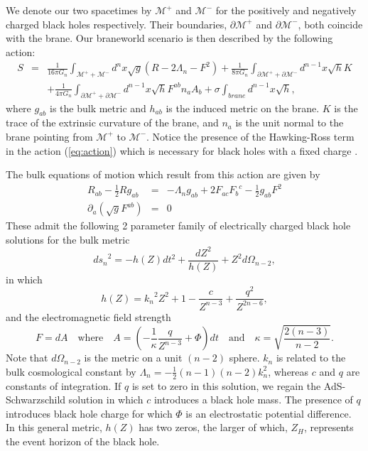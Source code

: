 \documentclass[a4paper,12pt]{article}
\begin{document}
We denote our two spacetimes by $\mathcal{M}^+$ and $\mathcal{M}^-$
for the positively and negatively charged black holes respectively.
Their boundaries, $\partial\mathcal{M}^+$ and $\partial\mathcal{M}^-$,
both coincide with the brane.  Our braneworld scenario is then
described by the following action:
\begin{eqnarray}
\label{eq:action}
S & = & \frac{1}{16\pi G_n}\int_{\mathcal{M}^+ + \mathcal{M}^-} d^n x
\sqrt{g}\left(R - 2\Lambda_n - F^2\right) + \frac{1}{8\pi
G_n}\int_{\partial\mathcal{M}^+ +\partial\mathcal{M}^-}
d^{n-1}x\sqrt{h} K \nonumber \\ & & + \frac{1}{4\pi
G_n}\int_{\partial\mathcal{M}^+ +\partial\mathcal{M}^-} d^{n-1}
x\sqrt{h} F^{a b} n_a A_b + \sigma\int_{brane} d^{n-1}x \sqrt{h} ,
\end{eqnarray}
where $g_{a b}$ is the bulk metric and $h_{ab}$ is the induced metric
on the brane.  $K$ is the trace of the extrinsic curvature  of the
brane, and $n_a$ is the unit normal to the brane pointing from
$\mathcal{M}^+$ to $\mathcal{M}^-$. Notice the presence of the
Hawking-Ross term in the action (\ref{eq:action}) which is necessary
for black holes with a fixed charge \cite{Hawking:ross}.

The bulk equations of motion which result from this action are given by
\begin{eqnarray}
R_{ab} - \frac{1}{2}R g_{ab} & = & -\Lambda_n g_{ab} + 2F_{ac}{F_b}^c
- \frac{1}{2}g_{ab} F^2 \\  \partial_a\left(\sqrt{g} F^{ab}\right) & =
& 0
\end{eqnarray}
These admit the following 2 parameter family of electrically charged
black hole solutions for the bulk metric
\begin{equation} \label{eqn:metric}
{ds_n}^2 = -h(Z)dt^2 + \frac{dZ^2}{h(Z)} + Z^2 d\Omega_{n-2},
\end{equation}
in which
\begin{equation} \label{eqn:h(Z)}
h(Z) = {k_n}^2 Z^2 + 1 - \frac{c}{Z^{n-3}} + \frac{q^2}{Z^{2n-6}},
\end{equation}
and the electromagnetic field strength
\begin{equation} \label{eqn:fieldstrength}
F = dA \quad \textrm{where} \quad A =
\left(-\frac{1}{\kappa}\frac{q}{Z^{n-3}} + \Phi\right) dt \quad
\textrm{and} \quad \kappa = \sqrt{\frac{2(n-3)}{n-2}}.
\end{equation}
Note that $d\Omega_{n-2}$ is the metric on a unit $(n-2)$
sphere. $k_n$ is related to the bulk cosmological constant by
$\Lambda_n=-\frac{1}{2}(n-1)(n-2)k_n^2$, whereas $c$ and $q$ are
constants of integration. If $q$ is set to zero in this solution, we
regain the AdS-Schwarzschild solution in which $c$ introduces a black
hole mass.  The presence of $q$ introduces black hole charge for which
$\Phi$ is an electrostatic potential difference.  In this general
metric, $h(Z)$ has two zeros, the larger of which, $Z_H$, represents
the event horizon of the black hole.
\end{document}
